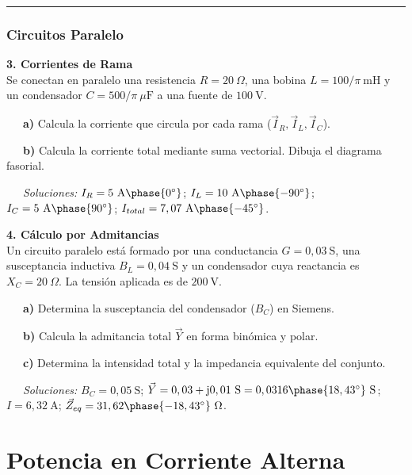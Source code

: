 \documentclass[
  a4paper,
  DIV=11,
  numbers=noendperiod]{scrreprt}
\begin{document}
\begin{tcolorbox}[enhanced jigsaw, breakable, colback=white, left=2mm, leftrule=.75mm, rightrule=.15mm, toprule=.15mm, colframe=quarto-callout-important-color-frame, arc=.35mm, bottomrule=.15mm, opacityback=0]
\begin{center}\rule{0.5\linewidth}{0.5pt}\end{center}

\subsection*{Circuitos Paralelo}\label{circuitos-paralelo}

\textbf{3. Corrientes de Rama}\\
Se conectan en paralelo una resistencia \(R=20 \ \Omega\), una bobina
\(L=100/\pi \ \text{mH}\) y un condensador \(C=500/\pi \ \mu\text{F}\) a
una fuente de \(100 \ \text{V}\).\\
\strut ~~~\textbf{a)} Calcula la corriente que circula por cada rama
(\(\vec{I}_R, \vec{I}_L, \vec{I}_C\)).\\
\strut ~~~\textbf{b)} Calcula la corriente total mediante suma
vectorial. Dibuja el diagrama fasorial.\\
\strut ~~~\emph{Soluciones:} \(I_R=5 \ \text{A} \phase{0^\circ}\);
\(I_L=10 \ \text{A} \phase{-90^\circ}\);
\(I_C=5 \ \text{A} \phase{90^\circ}\);
\(I_{total}=7,07 \ \text{A} \phase{-45^\circ}\).

\textbf{4. Cálculo por Admitancias}\\
Un circuito paralelo está formado por una conductancia
\(G=0,03 \ \text{S}\), una susceptancia inductiva
\(B_L=0,04 \ \text{S}\) y un condensador cuya reactancia es
\(X_C=20 \ \Omega\). La tensión aplicada es de \(200 \ \text{V}\).\\
\strut ~~~\textbf{a)} Determina la susceptancia del condensador
(\(B_C\)) en Siemens.\\
\strut ~~~\textbf{b)} Calcula la admitancia total \(\vec{Y}\) en forma
binómica y polar.\\
\strut ~~~\textbf{c)} Determina la intensidad total y la impedancia
equivalente del conjunto.\\
\strut ~~~\emph{Soluciones:} \(B_C=0,05 \ \text{S}\);
\(\vec{Y}=0,03+\mathrm{j}0,01 \ \text{S} = 0,0316 \phase{18,43^\circ} \ \text{S}\);
\(I=6,32 \ \text{A}\);
\(\vec{Z}_{eq}=31,62 \phase{-18,43^\circ} \ \Omega\).

\end{tcolorbox}


\chapter{Potencia en Corriente
Alterna}\label{potencia-en-corriente-alterna}
\end{document}
